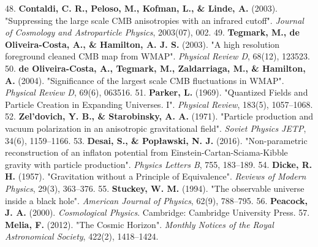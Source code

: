 \documentclass[11pt,a4paper]{article}
\theoremstyle{definition}
\theoremstyle{remark}
\begin{document}
48. \textbf{Contaldi, C. R., Peloso, M., Kofman, L., \& Linde, A.} (2003). "Suppressing the large scale CMB anisotropies with an infrared cutoff". \textit{Journal of Cosmology and Astroparticle Physics}, 2003(07), 002.
49. \textbf{Tegmark, M., de Oliveira-Costa, A., \& Hamilton, A. J. S.} (2003). "A high resolution foreground cleaned CMB map from WMAP". \textit{Physical Review D}, 68(12), 123523.
50. \textbf{de Oliveira-Costa, A., Tegmark, M., Zaldarriaga, M., \& Hamilton, A.} (2004). "Significance of the largest scale CMB fluctuations in WMAP". \textit{Physical Review D}, 69(6), 063516.
51. \textbf{Parker, L.} (1969). "Quantized Fields and Particle Creation in Expanding Universes. I". \textit{Physical Review}, 183(5), 1057–1068.
52. \textbf{Zel'dovich, Y. B., \& Starobinsky, A. A.} (1971). "Particle production and vacuum polarization in an anisotropic gravitational field". \textit{Soviet Physics JETP}, 34(6), 1159–1166.
53. \textbf{Desai, S., \& Popławski, N. J.} (2016). "Non-parametric reconstruction of an inflaton potential from Einstein-Cartan-Sciama-Kibble gravity with particle production". \textit{Physics Letters B}, 755, 183–189.
54. \textbf{Dicke, R. H.} (1957). "Gravitation without a Principle of Equivalence". \textit{Reviews of Modern Physics}, 29(3), 363–376.
55. \textbf{Stuckey, W. M.} (1994). "The observable universe inside a black hole". \textit{American Journal of Physics}, 62(9), 788–795.
56. \textbf{Peacock, J. A.} (2000). \textit{Cosmological Physics}. Cambridge: Cambridge University Press.
57. \textbf{Melia, F.} (2012). "The Cosmic Horizon". \textit{Monthly Notices of the Royal Astronomical Society}, 422(2), 1418–1424.
\end{document}
